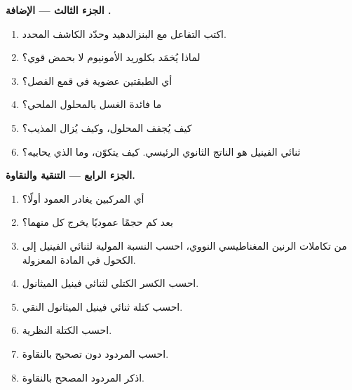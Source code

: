 \begin{problem}
\medskip
\noindent\textbf{الجزء الثالث --- الإضافة .}
\begin{enumerate}[resume]
  \item اكتب التفاعل مع البنزالدهيد وحدّد الكاشف المحدد.
  \item لماذا يُخمَد بكلوريد الأمونيوم لا بحمض قوي؟
  \item أي الطبقتين عضوية في قمع الفصل؟
  \item ما فائدة الغسل بالمحلول الملحي؟
  \item كيف يُجفف المحلول، وكيف يُزال المذيب؟
  \item ثنائي الفينيل هو الناتج الثانوي الرئيسي. كيف يتكوّن، وما الذي يحابيه؟
\end{enumerate}

\medskip
\noindent\textbf{الجزء الرابع --- التنقية والنقاوة.}
\begin{enumerate}[resume]
  \item أي المركبين يغادر العمود أولًا؟
  \item بعد كم حجمًا عموديًا يخرج كل منهما؟
  \item من تكاملات الرنين المغناطيسي النووي، احسب النسبة المولية لثنائي الفينيل إلى الكحول في المادة
        المعزولة.
  \item احسب الكسر الكتلي لثنائي فينيل الميثانول.
  \item احسب كتلة ثنائي فينيل الميثانول النقي.
  \item احسب الكتلة النظرية.
  \item احسب المردود دون تصحيح بالنقاوة.
  \item اذكر المردود المصحح بالنقاوة.
\end{enumerate}
\end{problem}
